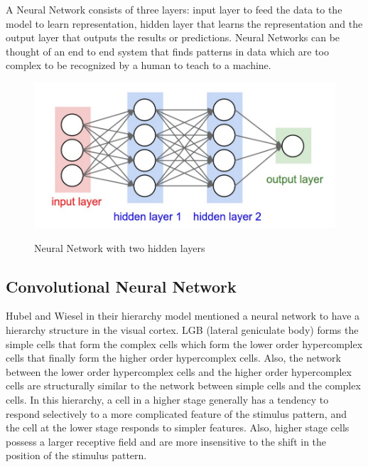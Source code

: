 A Neural Network consists of three layers: input layer to feed the data to the model to learn representation, hidden layer that learns the representation and the output layer that outputs the results or predictions. Neural Networks can be thought of an end to end system that finds patterns in data which are too complex to be recognized by a human to teach to a machine. 


\begin{figure}[H]
\begin{center}
\includegraphics[height=.28\textheight]{Chapter2/Figs/TwoLayeredNN.png}
\label{fig:Two Layered Neural_Network}
\caption{Neural Network with two hidden layers \cite{karparthy}}
\end{center}
\end{figure}


\subsection{Convolutional Neural Network}

Hubel and Wiesel in their hierarchy model mentioned a neural network to have a hierarchy structure in the visual cortex. LGB (lateral geniculate body) forms the simple cells that form the complex cells which form the lower order hypercomplex cells that finally form the higher order hypercomplex cells.
Also, the network between the lower order hypercomplex cells and the higher order hypercomplex cells are structurally similar to the network between simple cells and the complex cells. In this hierarchy, a cell in a higher stage generally has a tendency to respond selectively to a more complicated feature of the stimulus pattern, and the cell at the lower stage responds to simpler features. Also, higher stage cells possess a larger receptive field and are more insensitive to the shift in the position of the stimulus pattern.

